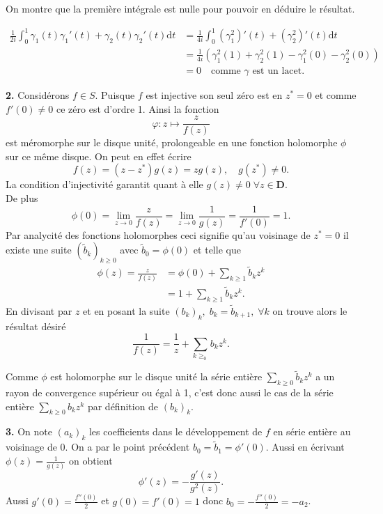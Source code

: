 \documentclass[12pt]{article}
\newcommand{\de}{\mathrm{d}}
\begin{document}
On montre que la première intégrale est nulle pour pouvoir en déduire le résultat.

\begin{align*}
        \frac{1}{2i}\int_{0}^{1}\gamma_{1}(t)\gamma_{1}'(t) + \gamma_{2}(t)\gamma_{2}'(t) \de t &= \frac{1}{4i}\int_{0}^{1}(\gamma_{1}^2)'(t) + (\gamma_{2}^2)'(t) \de t \\
                                                                                                &= \frac{1}{4i}(\gamma_1^2(1) + \gamma_2^2(1) - \gamma_1^2(0) - \gamma_2^2(0)) \\
                                                                                                &= 0 \quad \text{comme } \gamma \text{ est un lacet}
.\end{align*}

\textbf{2.} Considérons $f \in S$. Puisque $f$ est injective son seul zéro est en $z^{*} = 0$ et comme $f'(0) \neq 0$ ce zéro est d'ordre 1.  
Ainsi la fonction \[
        \varphi : z \longmapsto \frac{z}{f(z)}
\] est méromorphe sur le disque unité, prolongeable en une fonction holomorphe $\phi$ sur ce même disque. On peut en effet écrire \[
f(z) = (z - z^{*})g(z) = zg(z), \quad g(z^{*}) \neq 0
.\] La condition d'injectivité garantit quant à elle $g(z) \neq 0 \; \forall z \in \mathbf{D}$. \\
De plus \[
        \phi(0) = \lim_{z\to 0} \frac{z}{f(z)} = \lim_{z\to 0}\frac{1}{g(z)} = \frac{1}{f'(0)} = 1
.\]  
Par analycité des fonctions holomorphes ceci signifie qu'au voisinage de $z^{*} = 0$ il existe une suite $(\tilde{b}_{k})_{k\ge 0}$ avec $\tilde{b}_{0} = \phi(0)$ et telle que
\begin{align*}
        \phi(z) = \frac{z}{f(z)} &= \phi(0) + \sum_{k\ge1} \tilde{b}_{k}z^{k} \\
                                 &= 1 + \sum_{k\ge1} \tilde{b}_{k}z^{k}
.\end{align*}
En divisant par $z$ et en posant la suite $(b_k)_k, \; b_k = \tilde{b}_{k+1}, \; \forall k$ on trouve alors le résultat désiré  \[
        \frac{1}{f(z)} = \frac{1}{z} + \sum_{k\ge_0} b_{k}z^{k}
.\] 

Comme $\phi$ est holomorphe sur le disque unité la série entière $\sum_{k\ge 0}\tilde{b}_kz^k$ a un rayon de convergence supérieur ou égal à 1, c'est donc aussi le cas de la série entière $\sum_{k\ge 0}b_kz^k$ par définition de $(b_k)_k$.

\bigskip

\textbf{3.} On note $(a_{k})_{k}$ les coefficients dans le développement de $f$ en série entière au voisinage de 0. On a par le point précédent $b_{0} = \tilde{b}_{1} = \phi'(0)$. Aussi en écrivant $\phi(z) = \frac{1}{g(z)}$ on obtient \[
        \phi'(z) = -\frac{g'(z)}{g^{2}(z)}
.\] Aussi $g'(0) = \frac{f''(0)}{2}$ et $g(0) = f'(0) = 1$ donc $b_0 = -\frac{f''(0)}{2} = -a_{2}$.
\end{document}
